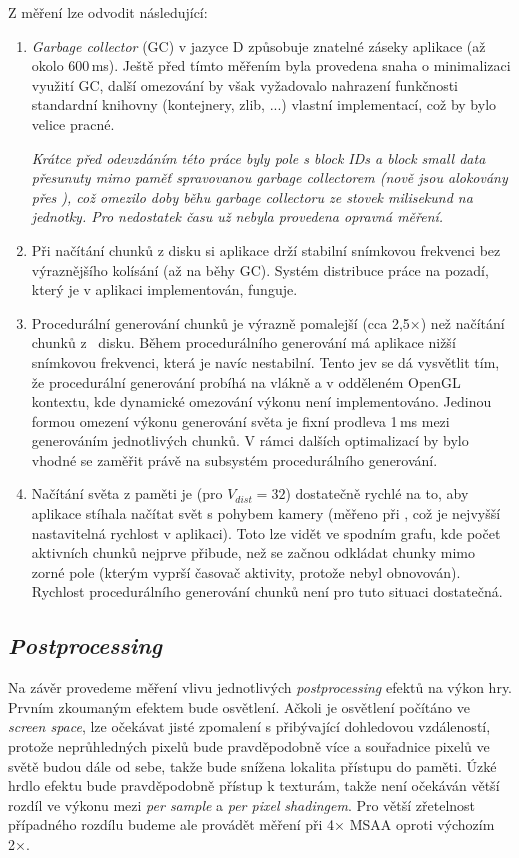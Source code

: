 \noindent Z měření lze odvodit následující:
\begin{enumerate}
	\item \textit{Garbage collector} (GC) v jazyce D způsobuje znatelné záseky aplikace (až okolo 600\,ms). Ještě před tímto měřením byla provedena snaha o minimalizaci využití GC, další omezování by však vyžadovalo nahrazení funkčnosti standardní knihovny (kontejnery, zlib, ...) vlastní implementací, což by bylo velice pracné.
	
	\textit{Krátce před odevzdáním této práce byly pole s \textit{block IDs} a \textit{block small data} přesunuty mimo paměť spravovanou \textit{garbage collectorem} (nově jsou alokovány přes ), což omezilo doby běhu \textit{garbage collectoru} ze stovek milisekund na jednotky. Pro nedostatek času už nebyla provedena opravná měření.}
	\item Při načítání chunků z disku si aplikace drží stabilní snímkovou frekvenci bez výraznějšího kolísání (až na běhy GC). Systém distribuce práce na pozadí, který je v aplikaci implementován, funguje.
	\item Procedurální generování chunků je výrazně pomalejší (cca 2,5×) než načítání chunků z~ disku. Během procedurálního generování má aplikace nižší snímkovou frekvenci, která je navíc nestabilní. Tento jev se dá vysvětlit tím, že procedurální generování probíhá na vlákně a v odděleném OpenGL kontextu, kde dynamické omezování výkonu není implementováno. Jedinou formou omezení výkonu generování světa je fixní prodleva 1\,ms mezi generováním jednotlivých chunků. V rámci dalších optimalizací by bylo vhodné se zaměřit právě na subsystém procedurálního generování.
	\item Načítání světa z paměti je (pro $V_{dist} = 32$) dostatečně rychlé na to, aby aplikace stíhala načítat svět s pohybem kamery (měřeno při , což je nejvyšší nastavitelná rychlost v aplikaci). Toto lze vidět ve spodním grafu, kde počet aktivních chunků nejprve přibude, než se začnou odkládat chunky mimo zorné pole (kterým vyprší časovač aktivity, protože nebyl obnovován). Rychlost procedurálního generování chunků není pro tuto situaci dostatečná.
\end{enumerate}

\subsection{\textit{Postprocessing}}
Na závěr provedeme měření vlivu jednotlivých \textit{postprocessing} efektů na výkon hry. Prvním zkoumaným efektem bude osvětlení. Ačkoli je osvětlení počítáno ve \textit{screen space}, lze očekávat jisté zpomalení s přibývající dohledovou vzdáleností, protože neprůhledných pixelů bude pravděpodobně více a souřadnice pixelů ve světě budou dále od sebe, takže bude snížena lokalita přístupu do paměti. Úzké hrdlo efektu bude pravděpodobně přístup k texturám, takže není očekáván větší rozdíl ve výkonu mezi \textit{per sample} a \textit{per pixel} \textit{shadingem}. Pro větší zřetelnost případného rozdílu budeme ale provádět měření při 4× MSAA oproti výchozím 2×.

